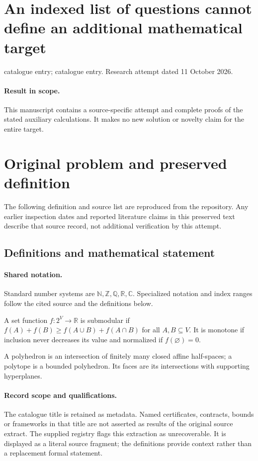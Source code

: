 \documentclass[11pt]{article}
\begin{document}
\section*{An indexed list of questions cannot define an additional mathematical target}
\noindent catalogue entry; catalogue entry. Research attempt dated 11 October 2026.
\paragraph{Result in scope.}This manuscript contains a source-specific attempt and complete proofs of the stated auxiliary calculations. It makes no new solution or novelty claim for the entire target.
\section{Original problem and preserved definition}
The following definition and source list are reproduced from the repository. Any earlier inspection dates and reported literature claims in this preserved text describe that source record, not additional verification by this attempt.
\subsection{Definitions and mathematical statement}

\paragraph{Shared notation.}Standard number systems are $\mathbb N,\mathbb Z,\mathbb Q,\mathbb R,\mathbb C$. Specialized notation and index ranges follow the cited source and the definitions below.


A set function $f:2^V\to\mathbb R$ is submodular if $f(A)+f(B)\geq f(A\cup B)+f(A\cap B)$ for all $A,B\subseteq V$. It is monotone if inclusion never decreases its value and normalized if $f(\varnothing)=0$.

A polyhedron is an intersection of finitely many closed affine half-spaces; a polytope is a bounded polyhedron. Its faces are its intersections with supporting hyperplanes.
\paragraph{Record scope and qualifications.}
The catalogue title is retained as metadata. Named certificates, contracts, bounds or frameworks in that title are not asserted as results of the original source extract.
The supplied registry flags this extraction as unrecoverable. It is displayed as a literal source fragment; the definitions provide context rather than a replacement formal statement.
\end{document}
